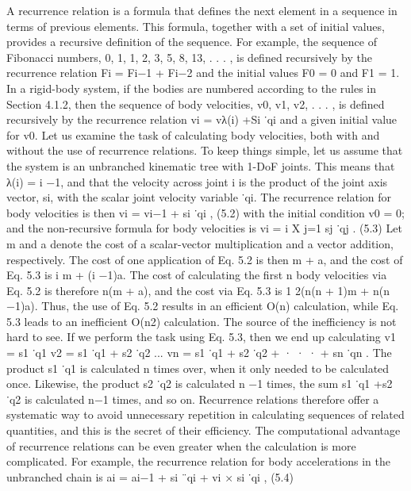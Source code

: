 A recurrence relation is a formula that defines the next element in a sequence in terms of previous elements. This formula, together with a set of initial values, provides a recursive definition of the sequence. For example, the sequence of Fibonacci numbers, 0, 1, 1, 2, 3, 5, 8, 13, . . . , is defined recursively by the recurrence relation Fi = Fi−1 + Fi−2 and the initial values F0 = 0 and F1 = 1. In a rigid-body system, if the bodies are numbered according to the rules in Section 4.1.2, then the sequence of body velocities, v0, v1, v2, . . . , is defined recursively by the recurrence relation vi = vλ(i) +Si ˙qi and a given initial value for v0. Let us examine the task of calculating body velocities, both with and without the use of recurrence relations. To keep things simple, let us assume that the system is an unbranched kinematic tree with 1-DoF joints. This means that λ(i) = i −1, and that the velocity across joint i is the product of the joint axis vector, si, with the scalar joint velocity variable ˙qi. The recurrence relation for body velocities is then vi = vi−1 + si ˙qi , (5.2) with the initial condition v0 = 0; and the non-recursive formula for body velocities is vi = i X j=1 sj ˙qj . (5.3) Let m and a denote the cost of a scalar-vector multiplication and a vector addition, respectively. The cost of one application of Eq. 5.2 is then m + a, and the cost of Eq. 5.3 is i m + (i −1)a. The cost of calculating the first n body velocities via Eq. 5.2 is therefore n(m + a), and the cost via Eq. 5.3 is 1 2(n(n + 1)m + n(n −1)a). Thus, the use of Eq. 5.2 results in an efficient O(n) calculation, while Eq. 5.3 leads to an inefficient O(n2) calculation. The source of the inefficiency is not hard to see. If we perform the task using Eq. 5.3, then we end up calculating v1 = s1 ˙q1 v2 = s1 ˙q1 + s2 ˙q2 ... vn = s1 ˙q1 + s2 ˙q2 + · · · + sn ˙qn . The product s1 ˙q1 is calculated n times over, when it only needed to be calculated once. Likewise, the product s2 ˙q2 is calculated n −1 times, the sum s1 ˙q1 +s2 ˙q2 is calculated n−1 times, and so on. Recurrence relations therefore offer a systematic way to avoid unnecessary repetition in calculating sequences of related quantities, and this is the secret of their efficiency. The computational advantage of recurrence relations can be even greater when the calculation is more complicated. For example, the recurrence relation for body accelerations in the unbranched chain is ai = ai−1 + si ¨qi + vi × si ˙qi , (5.4)

